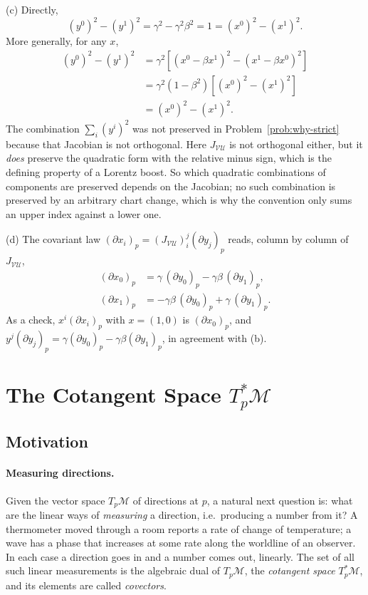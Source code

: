 \documentclass[11pt]{article}
\newcommand{\TpM}{T_p\mathcal M}
\begin{document}
(c) Directly,
\[
(y^0)^2-(y^1)^2=\gamma^2-\gamma^2\beta^2=1=(x^0)^2-(x^1)^2.
\]
More generally, for any $x$,
\begin{align*}
(y^0)^2-(y^1)^2
&=\gamma^2\left[(x^0-\beta x^1)^2-(x^1-\beta x^0)^2\right]\\
&=\gamma^2(1-\beta^2)\left[(x^0)^2-(x^1)^2\right]\\
&=(x^0)^2-(x^1)^2.
\end{align*}
The combination $\sum_i(y^i)^2$ was not preserved in
Problem~\ref{prob:why-strict} because that Jacobian is not orthogonal. Here
$J_{\mathcal{VU}}$ is not orthogonal either, but it \emph{does} preserve
the quadratic form with the relative minus sign, which is the defining
property of a Lorentz boost. So which quadratic combinations of components
are preserved depends on the Jacobian; no such combination is preserved by
an arbitrary chart change, which is why the convention only sums an upper
index against a lower one.

(d) The covariant law $(\partial x_i)_p=(J_{\mathcal{VU}})^j_i(\partial
y_j)_p$ reads, column by column of $J_{\mathcal{VU}}$,
\begin{align*}
(\partial x_0)_p&=\gamma\,(\partial y_0)_p-\gamma\beta\,(\partial y_1)_p,\\
(\partial x_1)_p&=-\gamma\beta\,(\partial y_0)_p+\gamma\,(\partial y_1)_p.
\end{align*}
As a check, $x^i(\partial x_i)_p$ with $x=(1,0)$ is $(\partial x_0)_p$,
and $y^j(\partial y_j)_p=\gamma(\partial y_0)_p-\gamma\beta(\partial
y_1)_p$, in agreement with (b).

\section{The Cotangent Space $T_p^*\mathcal M$}

\subsection*{Motivation}

\paragraph{Measuring directions.}
Given the vector space $\TpM$ of directions at $p$, a natural next question is: what are the linear ways of \emph{measuring} a direction, i.e.\ producing a number from it? A thermometer moved through a room reports a rate of change of temperature; a wave has a phase that increases at some rate along the worldline of an observer. In each case a direction goes in and a number comes out, linearly. The set of all such linear measurements is the algebraic dual of $\TpM$, the \emph{cotangent space} $T_p^*\mathcal M$, and its elements are called \emph{covectors}.
\end{document}
